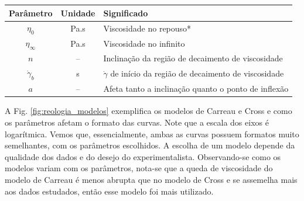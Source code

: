 		\begin{table}[h]
			{%
				\begin{tabular}{c c p{9cm}}
					\toprule
					    Parâmetro      & Unidade   & Significado                                                       \\ \midrule
					    \(\eta_0\)     & Pa.s      & Viscosidade no repouso*                                           \\
					\(\eta_{\infty}\)  & Pa.s      & Viscosidade no infinito                                           \\
					      \(n\)        & --        & Inclinação da região de decaimento de viscosidade                 \\
					\(\dot{\gamma}_b\) & s\menosUm & \(\dot{\gamma}\) de início da região de decaimento de viscosidade \\ \midrule
					      \(a\)        & --        & Afeta tanto a inclinação quanto o ponto de inflexão               \\ \bottomrule
				\end{tabular}%
			}{}
		\end{table}
		
		A Fig. \ref{fig:reologia_modelos} exemplifica os modelos de Carreau e Cross e como os parâmetros afetam o formato das curvas. Note que a escala dos eixos é logarítmica. Vemos que, essencialmente, ambas as curvas possuem formatos muito semelhantes, com os parâmetros escolhidos. A escolha de um modelo depende da qualidade dos dados e do desejo do experimentalista. Observando-se como os modelos variam com os parâmetros, nota-se que a queda de viscosidade do modelo de Carreau é menos abrupta que no modelo de Cross e se assemelha mais aos dados estudados, então esse modelo foi mais utilizado.
		
